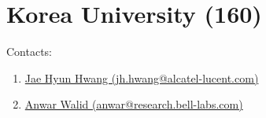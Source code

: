 


\section{Korea University (160)}
\label{sec:KRU}

Contacts:\begin{enumerate}
 \item {}\href{mailto:jh.hwang@alcatel-lucent.com}{Jae Hyun Hwang (jh.hwang@alcatel-lucent.com)}
 \item {}\href{mailto:anwar@research.bell-labs.com}{Anwar Walid (anwar@research.bell-labs.com)}
\end{enumerate}

